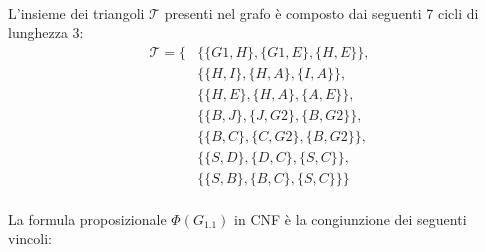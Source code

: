 \documentclass[10pt]{article}
\begin{document}
\paragraph{}
L'insieme dei triangoli $\mathcal{T}$ presenti nel grafo è composto dai seguenti 7 cicli di lunghezza 3:
\[
\begin{aligned}
\mathcal{T} = \{ & \{\{G1, H\}, \{G1, E\}, \{H, E\}\}, \\
& \{\{H, I\}, \{H, A\}, \{I, A\}\}, \\
& \{\{H, E\}, \{H, A\}, \{A, E\}\}, \\
& \{\{B, J\}, \{J, G2\}, \{B, G2\}\}, \\
& \{\{B, C\}, \{C, G2\}, \{B, G2\}\}, \\
& \{\{S, D\}, \{D, C\}, \{S, C\}\}, \\
& \{\{S, B\}, \{B, C\}, \{S, C\}\} \}
\end{aligned}
\]

\paragraph{}
La formula proposizionale $\Phi(G_{1.1})$ in CNF è la congiunzione dei seguenti vincoli:
\end{document}
